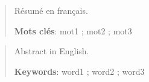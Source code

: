 \resume
{}
\vspace*{-6cm}
\begin{abstract}
	Résumé en français.

	\medskip\noindent
	\textbf{Mots clés}: mot1 ; mot2 ; mot3   %
\end{abstract}

\newpage
\thispagestyle{empty}
\begin{abstract}
	Abstract in English.

	\medskip\noindent
	\textbf{Keywords}: word1 ; word2 ; word3
\end{abstract}
